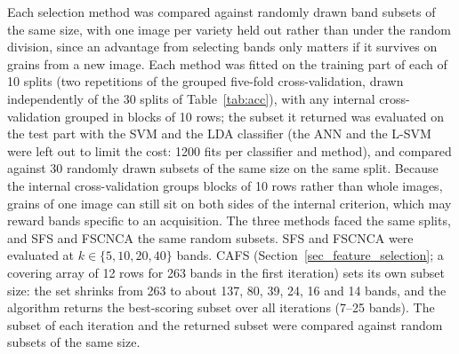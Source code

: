 \documentclass[final,5p,times,twocolumn]{elsarticle}
\newcommand{\added}[1]{{\color{blue}#1}}
\begin{document}
\added{Each selection method was compared against randomly drawn band subsets of the same size, with one image per variety held out rather than under the random division, since an advantage from selecting bands only matters if it survives on grains from a new image. Each method was fitted on the training part of each of 10 splits (two repetitions of the grouped five-fold cross-validation, drawn independently of the 30 splits of Table~\ref{tab:acc}), with any internal cross-validation grouped in blocks of 10 rows; the subset it returned was evaluated on the test part with the SVM and the LDA classifier (the ANN and the L-SVM were left out to limit the cost: 1200 fits per classifier and method), and compared against 30 randomly drawn subsets of the same size on the same split. Because the internal cross-validation groups blocks of 10 rows rather than whole images, grains of one image can still sit on both sides of the internal criterion, which may reward bands specific to an acquisition. The three methods faced the same splits, and SFS and FSCNCA the same random subsets. SFS and FSCNCA were evaluated at $k\in\{5,10,20,40\}$ bands. CAFS (Section~\ref{sec_feature_selection}; a covering array of 12 rows for 263 bands in the first iteration) sets its own subset size: the set shrinks from 263 to about 137, 80, 39, 24, 16 and 14 bands, and the algorithm returns the best-scoring subset over all iterations (7--25 bands). The subset of each iteration and the returned subset were compared against random subsets of the same size.}
\end{document}
